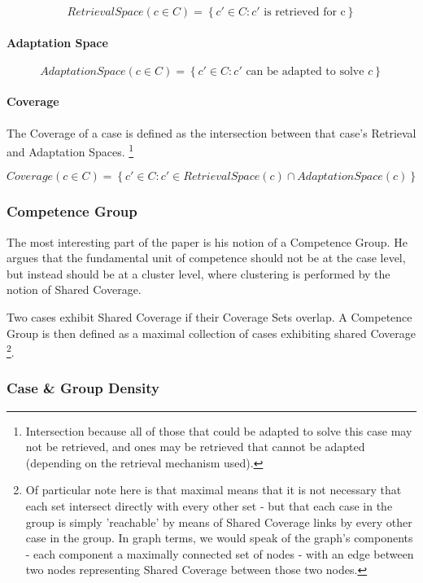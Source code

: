 \documentclass[a4paper,11pt]{report}
\begin{document}
\[ RetrievalSpace(c \in C) = \left\{ c \prime \in C : c \prime \text{ is retrieved for c} \right\} \]

\paragraph{Adaptation Space}

\[ AdaptationSpace(c \in C) = \left\{ c \prime \in C : c \prime \text{ can be adapted to solve } c \right\} \]

\paragraph{Coverage}

The Coverage of a case is defined as the intersection between that case's Retrieval and Adaptation Spaces. \footnote{Intersection because all of those that could be adapted to solve this case may not be retrieved, and ones may be retrieved that cannot be adapted (depending on the retrieval mechanism used).}

\[ Coverage(c \in C) = \left\{ c \prime \in C : c \prime \in RetrievalSpace(c) \cap AdaptationSpace(c) \right\} \]


\subsubsection{Competence Group}
The most interesting part of the paper is his notion of a Competence Group. He argues that the fundamental unit of competence should not be at the case level, but instead should be at a cluster level, where clustering is performed by the notion of Shared Coverage.

Two cases exhibit Shared Coverage if their Coverage Sets overlap. A Competence Group is then defined as a maximal  collection  of  cases  exhibiting  shared Coverage \footnote{Of particular note here is that maximal means that it is not necessary that each set intersect directly with every other set - but that each case in the group is simply 'reachable' by means of Shared Coverage links by every other case in the group. In graph terms, we would speak of the graph's components - each component a maximally connected set of nodes - with an edge between two nodes representing Shared Coverage between those two nodes.}.

\subsubsection{Case \& Group Density}
\end{document}
